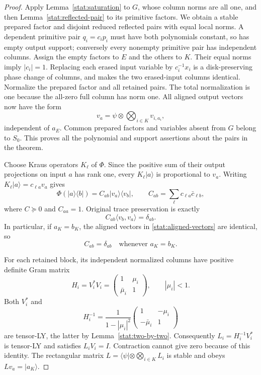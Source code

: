 \documentclass[reqno]{amsart}
\theoremstyle{definition}
\theoremstyle{remark}
\begin{document}
\begin{proof}
Apply Lemma~\ref{stat:saturation} to \(G\), whose column norms
are all one, and then Lemma~\ref{stat:reflected-pair} to its
primitive factors.  We obtain a stable prepared factor and
disjoint reduced reflected pairs with equal local norms.  A
dependent primitive pair \(q_i=c_ip_i\) must have both
polynomials constant, so has empty output support; conversely
every nonempty primitive pair has independent columns.  Assign
the empty factors to \(E\) and the others to \(K\).  Their
equal norms imply \(|c_i|=1\).  Replacing each erased input
variable by \(c_i^{-1}x_i\) is a disk-preserving phase change
of columns, and makes the two erased-input columns identical.
Normalize the prepared factor and all retained pairs.  The total
normalization is one because the all-zero full column has norm
one.  All aligned output vectors now have the form
\begin{equation}
 v_a=\psi\otimes\bigotimes_{i\in K}v_{i,a_i},
 \label{stat:aligned-vectors}
\end{equation}
independent of \(a_E\).  Common prepared factors and variables
absent from \(G\) belong to \(S_0\).  This proves all the
polynomial and support assertions about the pairs in the theorem.

Choose Kraus operators \(K_\ell\) of \(\Phi\).  Since the
positive sum of their output projections on input \(a\) has
rank one, every \(K_\ell|a\rangle\) is proportional to \(v_a\).
Writing \(K_\ell|a\rangle=c_{\ell a}v_a\) gives
\begin{equation}
 \Phi(|a\rangle\langle b|)=C_{ab}|v_a\rangle\langle v_b|,
 \qquad C_{ab}=\sum_\ell c_{\ell a}\bar c_{\ell b},
 \label{stat:kraus-correlation}
\end{equation}
where \(C\succeq0\) and \(C_{aa}=1\).  Original trace
preservation is exactly
\begin{equation}
 C_{ab}\langle v_b,v_a\rangle=\delta_{ab}.
 \label{stat:original-trace}
\end{equation}
In particular, if \(a_K=b_K\), the aligned vectors in
\eqref{stat:aligned-vectors} are identical, so
\begin{equation}
 C_{ab}=\delta_{ab}\quad\text{whenever }a_K=b_K.
 \label{stat:erased-trace}
\end{equation}

For each retained block, its independent normalized columns have
positive definite Gram matrix
\[
 H_i=V_i^*V_i=\begin{pmatrix}1&\mu_i\\\bar\mu_i&1\end{pmatrix},
 \qquad |\mu_i|<1.
\]
Both \(V_i^*\) and
\[
 H_i^{-1}=\frac1{1-|\mu_i|^2}
       \begin{pmatrix}1&-\mu_i\\-\bar\mu_i&1\end{pmatrix}
\]
are tensor-LY, the latter by Lemma~\ref{stat:two-by-two}.
Consequently \(L_i=H_i^{-1}V_i^*\) is tensor-LY and satisfies
\(L_iV_i=I\).  Contraction cannot give zero because of this
identity.  The rectangular matrix
\(L=\langle\psi|\otimes\bigotimes_{i\in K}L_i\) is stable
and obeys \(Lv_a=|a_K\rangle\).


\end{proof}
\end{document}
